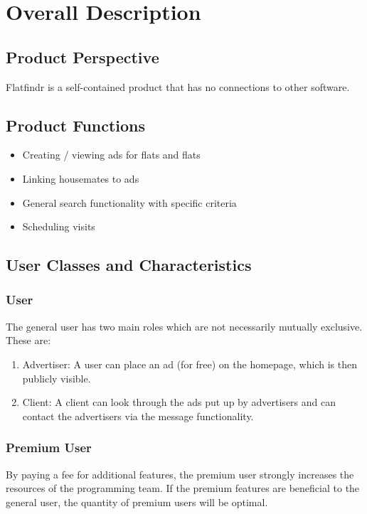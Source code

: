 \section{Overall Description}
\subsection{Product Perspective}
	Flatfindr is a self-contained product that has no connections to other software.	

\subsection{Product Functions}
\begin{itemize}
	\item Creating / viewing ads for flats and flats
	\item Linking housemates to ads
	\item General search functionality with specific criteria
	\item Scheduling visits
	\end{itemize}

\subsection{User Classes and Characteristics}
	\subsubsection{User}
		The general user has two main roles which are not necessarily mutually exclusive. These are: \\
		\begin{enumerate}
		\item 		Advertiser: A user can place an ad (for free) on the homepage, which is then publicly visible.
		\item		Client: A client can look through the ads put up by advertisers and can contact the advertisers via the message functionality.
		\end{enumerate}
		
	\subsubsection{Premium User}
		By paying a fee for additional features, the premium user strongly increases the resources 
		of the programming team. If the premium features are beneficial to the general user, the 
		quantity of premium users will be optimal.
		
